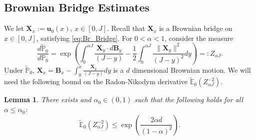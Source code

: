 \documentclass[12pt]{amsart}
\numberwithin{equation}{section}
\newtheorem{lem}{Lemma}[section]
\theoremstyle{definition}
\numberwithin{equation}{section}
\newcommand{\be}{\begin{equation}}
\newcommand{\ee}{\end{equation}}
\newcommand{\bes}{\begin{equation*}}
\newcommand{\ees}{\end{equation*}}
\newcommand{\mP}{\mathbb{P}}
\newcommand{\X}{\mathbf{X}}
\newcommand{\E}{\mathbb{E}}
\newcommand{\uv}{\mathbf u}
\begin{document}
\subsection{Brownian Bridge Estimates} \label{sec:be}
We let $\X_x := \uv_0(x),\, x\in [0,J]$. Recall that $\X_x$ is a Brownian 
bridge on $x\in[0,J]$, satisfying \eqref{eq:Br_Bridge}.  
For $0<\alpha<1$, consider the measure
\be \label{eq:measure:girs} \frac{d\tilde{\mP}_0}{d\mP_0} = \exp\left(\int_0^{\alpha J}\frac{\X_y \cdot d\mathbf{B}_y}{(J-y)} -\frac{1}{2}\int_0^{\alpha J}\frac{\|\X_y\|^2}{(J-y)^2}dy\right)=: Z_{\alpha J} .\ee
Under $\tilde{\mP}_0$, $ \X_x= \mathbf{B}_x - \int_0^x \frac{\X_y}{(J-y)} dy $ is a $d$ dimensional Brownian motion. We will need the following bound on the Radon-Nikodym derivative $\tilde{\E}_0\left(Z_{\alpha J}^{-2}\right)$.
\begin{lem}\label{lem:girsanov} There exists and $\alpha_0 \in (0,1)$ such that the following holds for all $\alpha \le \alpha_0$:
\bes
\tilde{\E}_0\left(Z_{\alpha J}^{-2}\right) \le \exp\left(\frac{2\alpha d }{(1-\alpha)^2}\right).
\ees
\end{lem}
\end{document}
